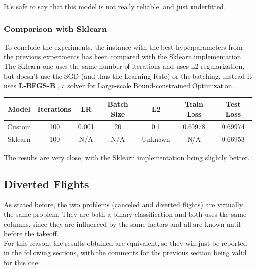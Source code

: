 \documentclass[
	letterpaper, %
	10pt, %
]{class}
\begin{document}
It's safe to say that this model is not really reliable, and just underfitted.

\subsubsection{Comparison with Sklearn}

To conclude the experiments, the instance with the best hyperparameters from the previous experiments has been compared with the Sklearn implementation.\\

The Sklearn one uses the same number of iterations and uses L2 regularization, but doesn't use the SGD (and thus the Learning Rate) or the batching.
Instead it uses \textbf{L-BFGS-B} \cite{lbfgsb}, a solver for Large-scale Bound-constrained Optimization.

\begin{center}
    \begin{tabular}{ |c|c|c|c|c|c|c| }
        \hline
        Model   & Iterations & LR    & Batch Size & L2      & Train Loss & Test Loss \\
        \hline
        Custom  & 100        & 0.001 & 20         & 0.1     & 0.60978    & 0.69974   \\
        Sklearn & 100        & N/A   & N/A        & Unknown & N/A        & 0.66953   \\
        \hline
    \end{tabular}
\end{center}

The results are very close, with the Sklearn implementation being slightly better.

\subsection{Diverted Flights}

As stated before, the two problems (canceled and diverted flights) are virtually the same problem. They are both a binary classification and both uses the same columns, since they are influenced by the same factors and all are known until before the takeoff.\\

For this reason, the results obtained are equivalent, so they will just be reported in the following sections, with the comments for the previous section being valid for this one.
\end{document}
